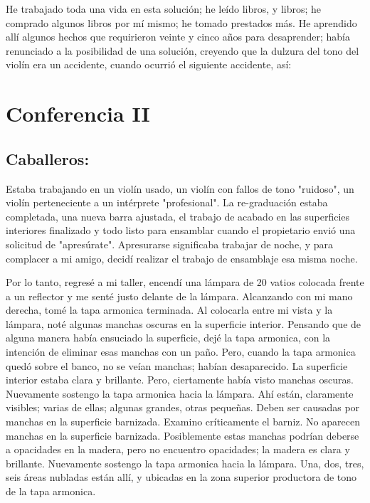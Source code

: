 \documentclass[12pt]{book}
\begin{document}
He trabajado toda una vida en esta solución; he leído libros, y libros; he comprado algunos libros por mí mismo; he tomado prestados más. He aprendido allí algunos hechos que requirieron veinte y cinco años para desaprender; había renunciado a la posibilidad de una solución, creyendo que la dulzura del tono del violín era un accidente, cuando ocurrió el siguiente accidente, así:

\chapter *{Conferencia II}
\section*{Caballeros:}

Estaba trabajando en un violín usado, un violín con fallos de tono "ruidoso", un violín perteneciente a un intérprete "profesional". La re-graduación estaba completada, una nueva barra ajustada, el trabajo de acabado en las superficies interiores finalizado y todo listo para ensamblar cuando el propietario envió una solicitud de "apresúrate". Apresurarse significaba trabajar de noche, y para complacer a mi amigo, decidí realizar el trabajo de ensamblaje esa misma noche.

Por lo tanto, regresé a mi taller, encendí una lámpara de 20 vatios colocada frente a un reflector y me senté justo delante de la lámpara. Alcanzando con mi mano derecha, tomé la tapa armonica terminada. Al colocarla entre mi vista y la lámpara, noté algunas manchas oscuras en la superficie interior. Pensando que de alguna manera había ensuciado la superficie, dejé la tapa armonica, con la intención de eliminar esas manchas con un paño. Pero, cuando la tapa armonica quedó sobre el banco, no se veían manchas; habían desaparecido. La superficie interior estaba clara y brillante. Pero, ciertamente había visto manchas oscuras. Nuevamente sostengo la tapa armonica hacia la lámpara. Ahí están, claramente visibles; varias de ellas; algunas grandes, otras pequeñas. Deben ser causadas por manchas en la superficie barnizada. Examino críticamente el barniz. No aparecen manchas en la superficie barnizada. Posiblemente estas manchas podrían deberse a opacidades en la madera, pero no encuentro opacidades; la madera es clara y brillante. Nuevamente sostengo la tapa armonica hacia la lámpara. Una, dos, tres, seis áreas nubladas están allí, y ubicadas en la zona superior productora de tono de la tapa armonica.
\end{document}
